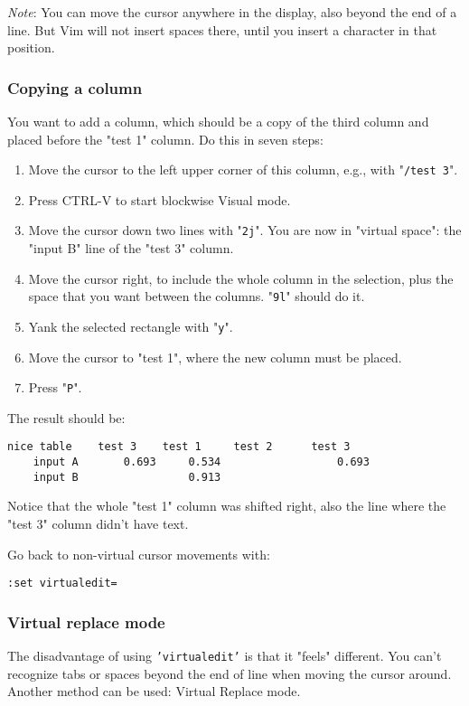 \emph{Note}: You can move the cursor anywhere in the display, also beyond the end of a line.
But Vim will not insert spaces there, until you insert a character in that position.

\subsubsection{Copying a column}
You want to add a column, which should be a copy of the third column and placed before the "test 1" column.
Do this in seven steps:

\begin{enumerate}
\item Move the cursor to the left upper corner of this column, e.g., with "\texttt{/test 3}".
\item Press CTRL-V to start blockwise Visual mode.
\item Move the cursor down two lines with "\verb!2j!".  You are now in "virtual space": the "input B" line of the "test 3" column.
\item Move the cursor right, to include the whole column in the selection, plus the space that you want between the columns.  "\texttt{9l}" should do it.
\item Yank the selected rectangle with "\texttt{y}".
\item Move the cursor to "test 1", where the new column must be placed.
\item Press "\texttt{P}".
\end{enumerate}

The result should be:

\begin{Verbatim}[samepage=true]
    nice table    test 3    test 1     test 2      test 3 
    input A       0.693     0.534                  0.693 
    input B                 0.913 
\end{Verbatim}

Notice that the whole "test 1" column was shifted right, also the line where the "test 3" column didn't have text.

Go back to non-virtual cursor movements with:

\begin{Verbatim}[samepage=true]
 :set virtualedit=
\end{Verbatim}

\subsubsection{Virtual replace mode}
The disadvantage of using \texttt{'virtualedit'} is that it "feels" different.
You can't recognize tabs or spaces beyond the end of line when moving the cursor around.
Another method can be used: Virtual Replace mode.


